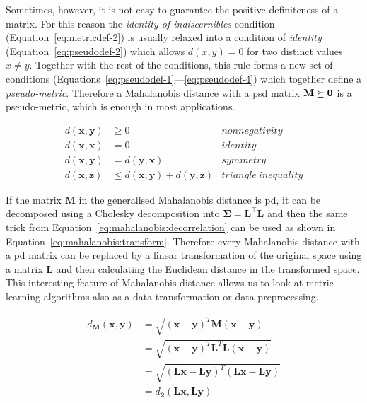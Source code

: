 Sometimes, however, it is not easy to guarantee the positive definiteness of a matrix. For this reason the \textit{identity of indiscernibles} condition (Equation~\ref{eq:metricdef-2}) is usually relaxed into a condition of \textit{identity} (Equation~\ref{eq:pseudodef-2}) which allows $d(x,y)=0$ for two distinct values $x \neq y$. Together with the rest of the conditions, this rule forms a new set of conditions (Equations~\ref{eq:pseudodef-1}---\ref{eq:pseudodef-4}) which together define a \textit{pseudo-metric}. Therefore a Mahalanobis distance with a \ac{psd} matrix $\bf{M} \succeq 0$ is a pseudo-metric, which is enough in most applications.

\begin{align}
d(\textbf{x},\textbf{y}) &\geq 0 & nonnegativity \label{eq:pseudodef-1} \\
d(\textbf{x},\textbf{x}) &= 0 & identity \label{eq:pseudodef-2} \\
d(\textbf{x},\textbf{y}) &= d(\textbf{y},\textbf{x}) & symmetry \label{eq:pseudodef-3} \\
d(\textbf{x},\textbf{z}) &\leq d(\textbf{x},\textbf{y}) + d(\textbf{y},\textbf{z}) & triangle \ inequality \label{eq:pseudodef-4}
\end{align} 

If the matrix $\bm{M}$ in the generalised Mahalanobis distance is \ac{pd}, it can be decomposed using a Cholesky decomposition into $\bm{\Sigma}=\bm{L}^\top\bm{L}$ and then the same trick from Equation~\ref{eq:mahalanobis:decorrelation} can be used as shown in Equation~\ref{eq:mahalanobis:transform}. Therefore every Mahalanobis distance with a \ac{pd} matrix can be replaced by a linear transformation of the original space using a matrix $\bm{L}$ and then calculating the Euclidean distance in the transformed space. This interesting feature of Mahalanobis distance allows us to look at metric learning algorithms also as a data transformation or data preprocessing.

\begin{align}
  d_{\bm{M}}(\textbf{x},\textbf{y}) &= \sqrt{(\textbf{x}-\textbf{y})^{T}\bm{M}(\textbf{x}-\textbf{y})} \nonumber\\
         &= \sqrt{(\textbf{x}-\textbf{y})^{T}\bm{L}^{T}\bm{L}(\textbf{x}-\textbf{y})} \nonumber\\
         &= \sqrt{(\bm{L}\textbf{x}-\bm{L}\textbf{y})^{T}(\bm{L}\textbf{x}-\bm{L}\textbf{y})} \nonumber\\
         &= d_{\bm{2}}(\bm{L}\textbf{x}, \bm{L}\textbf{y}) \label{eq:mahalanobis:transform}
\end{align}

